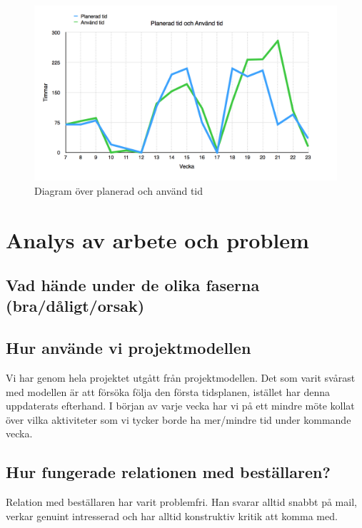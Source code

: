 \documentclass[a4paper,12pt,fleqn]{article}
\begin{document}
\begin{figure}[htp] %
  \begin{center}
  \includegraphics[keepaspectratio=true,scale=0.25]{tid.png}  %
  \end{center}
  \caption{Diagram över planerad och använd tid} %
  \label{fig:tid}
\end{figure}

\newpage

\section{Analys av arbete och problem}

\subsection{Vad hände under de olika faserna (bra/dåligt/orsak)}

\subsection{Hur använde vi projektmodellen}
Vi har genom hela projektet utgått från projektmodellen. Det som varit svårast med modellen är att försöka följa den första tidsplanen, istället har denna uppdaterats efterhand. I början av varje vecka har vi på ett mindre möte kollat över vilka aktiviteter som vi tycker borde ha mer/mindre tid under kommande vecka.

\subsection{Hur fungerade relationen med beställaren?}
Relation med beställaren har varit problemfri. Han svarar alltid snabbt på mail, verkar genuint intresserad och har alltid konstruktiv kritik att komma med.
\end{document}

